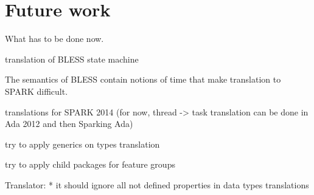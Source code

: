 
\cleardoublepage

\chapter{Future work}
\label{future_work}

What has to be done now.

translation of BLESS state machine

The semantics of BLESS contain notions of time that make translation to SPARK difficult.

translations for SPARK 2014 (for now, thread -> task translation can be done in Ada 2012 and then Sparking Ada)

try to apply generics on types translation

try to apply child packages for feature groups

Translator:
* it should ignore all not defined properties in data types translations